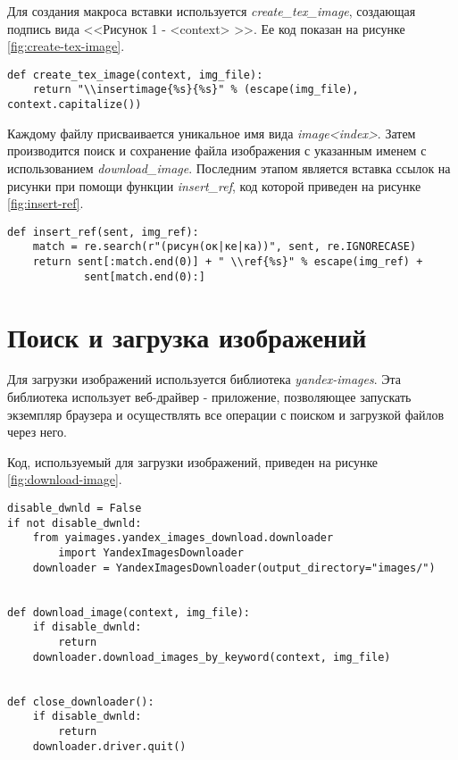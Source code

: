 Для создания макроса вставки используется \emph{create_tex_image}, создающая
подпись вида <<Рисунок 1 - <context> >>. Ее код показан на рисунке
\ref{fig:create-tex-image}.

\begin{codewrap}[1]
\begin{verbatim}
def create_tex_image(context, img_file):
    return "\\insertimage{%s}{%s}" % (escape(img_file), context.capitalize())
\end{verbatim}
\caption{}\label{fig:create-tex-image}
\end{codewrap}

Каждому файлу присваивается уникальное имя вида \emph{image<index>}. Затем
производится поиск и сохранение файла изображения с указанным именем с
использованием \emph{download_image}. Последним этапом является вставка ссылок
на рисунки при помощи функции \emph{insert_ref}, код которой приведен на рисунке
\ref{fig:insert-ref}.

\begin{codewrap}[0.75]
\begin{verbatim}
def insert_ref(sent, img_ref):
    match = re.search(r"(рисун(ок|ке|ка))", sent, re.IGNORECASE)
    return sent[:match.end(0)] + " \\ref{%s}" % escape(img_ref) +
            sent[match.end(0):]
\end{verbatim}
\caption{}\label{fig:insert-ref}
\end{codewrap}

\section{Поиск и загрузка изображений}

Для загрузки изображений используется библиотека \emph{yandex-images}. Эта
библиотека использует веб-драйвер - приложение, позволяющее запускать экземпляр
браузера и осуществлять все операции с поиском и загрузкой файлов через него.

Код, используемый для загрузки изображений, приведен на рисунке
\ref{fig:download-image}.

\begin{codewrap}[0.75]
\begin{verbatim}
disable_dwnld = False
if not disable_dwnld:
    from yaimages.yandex_images_download.downloader
        import YandexImagesDownloader
    downloader = YandexImagesDownloader(output_directory="images/")


def download_image(context, img_file):
    if disable_dwnld:
        return
    downloader.download_images_by_keyword(context, img_file)


def close_downloader():
    if disable_dwnld:
        return
    downloader.driver.quit()
\end{verbatim}
\caption{}\label{fig:download-image}
\end{codewrap}

